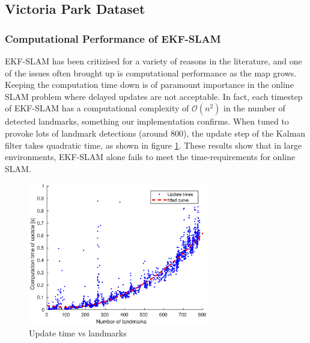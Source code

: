 \subsection{Victoria Park Dataset}
\subsubsection{Computational Performance of EKF-SLAM}
EKF-SLAM has been critizised for a variety of reasons in the literature, and one of the issues often brought up is computational performance as the map grows. Keeping the computation time down is of paramount importance in the online SLAM problem where delayed updates are not acceptable. In fact, each timestep of EKF-SLAM has a computational complexity of $\mathcal{O}(n^2)$ in the number of detected landmarks\cite{divideandconq}, something our implementation confirms. When tuned to provoke lots of landmark detections (around 800), the update step of the Kalman filter takes quadratic time, as shown in figure \ref{fig:update_time_landmarks}. These results show that in large environments, EKF-SLAM alone fails to meet the time-requirements for online SLAM.
\begin{figure}[H]
\centering
\includegraphics[width=0.7\textwidth]{plots/a3/update-time-vs-landmarks}
\caption{Update time vs landmarks}
\label{fig:update_time_landmarks}
\end{figure}


